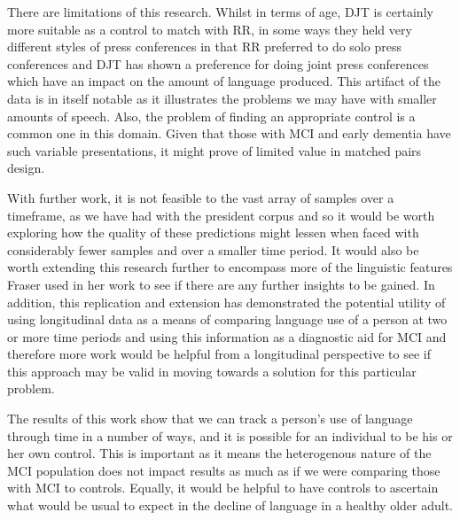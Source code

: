 \documentclass[10pt, letterpaper, twoside, openany]{thesis}
\begin{document}
There are limitations of this research. Whilst in terms of age, DJT is certainly more suitable as a control to match with RR, in some ways they held very different styles of press conferences in that RR preferred to do solo press conferences and DJT has shown a preference for doing joint press conferences which have an impact on the amount of language produced. This artifact of the data is in itself notable as it illustrates the problems we may have with smaller amounts of speech. Also, the problem of finding an appropriate control is a common one in this domain. Given that those with MCI and early dementia have such variable presentations, it might prove of limited value in matched pairs design. 
\par 
With further work, it is not feasible to the vast array of samples over a timeframe, as we have had with the president corpus and so it would be worth exploring how the quality of these predictions might lessen when faced with considerably fewer samples and over a smaller time period. It would also be worth extending this research further to encompass more of the linguistic features Fraser used in her work \cite{Fraser2015} to see if there are any further insights to be gained. In addition, this replication and extension has demonstrated the potential utility of using longitudinal data as a means of comparing language use of a person at two or more time periods and using this information as a diagnostic aid for MCI and therefore more work would be helpful from a longitudinal perspective to see if this approach may be valid in moving towards a solution for this particular problem. 
\par 
The results of this work show that we can track a person's use of language through time in a number of ways, and it is possible for an individual to be his or her own control. This is important as it means the heterogenous nature of the MCI population does not impact results as much as if we were comparing those with MCI to controls. Equally, it would be helpful to have controls to ascertain what would be usual to expect in the decline of language in a healthy older adult. 
\end{document}
